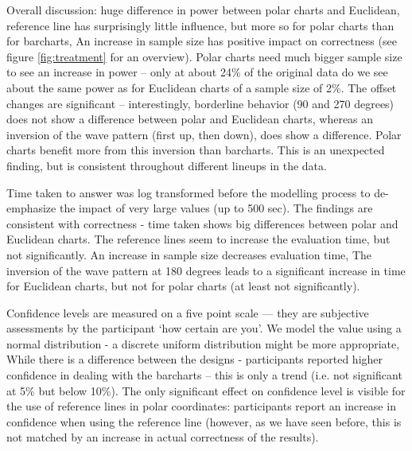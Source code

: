 Overall discussion: huge difference in power between polar charts and Euclidean, reference line has surprisingly little influence, but more so for polar charts than for barcharts,
An increase in sample size has positive impact on correctness (see figure \ref{fig:treatment} for an overview). Polar charts need much bigger sample size to see an increase in power -- only at about 24\% of the original data do we see about the same power as for Euclidean charts of a sample size of 2\%.
The offset changes are significant -- interestingly, borderline behavior (90 and 270 degrees) does not show a difference between polar and Euclidean charts, whereas an inversion of the wave pattern (first up, then down), does show a difference. Polar charts benefit more from this inversion than barcharts. This is an unexpected finding, but is consistent throughout different lineups in the data.

Time taken to answer was log transformed before the modelling process to de-emphasize the impact of very large values (up to 500 sec). The findings are consistent with correctness - time taken shows big differences between polar and Euclidean charts. The reference lines seem to increase the evaluation time, but not significantly. An increase in sample size decreases evaluation time, The inversion of the wave pattern at 180 degrees leads to a significant increase in time for Euclidean charts, but not for polar charts (at least not significantly). 

 Confidence levels are measured on a five point scale --- they are subjective assessments by the participant `how certain are you'. We model the value using a normal distribution - a discrete uniform distribution  might be more appropriate,
While there is a difference between the designs - participants reported higher confidence in dealing with the barcharts -- this is only  a trend (i.e. not significant at 5\% but below 10\%). The only significant effect on confidence level is visible for the use of reference lines in polar coordinates: participants report an increase in confidence when using the reference line (however, as we have seen before, this is not matched by an increase in actual correctness of the results).

